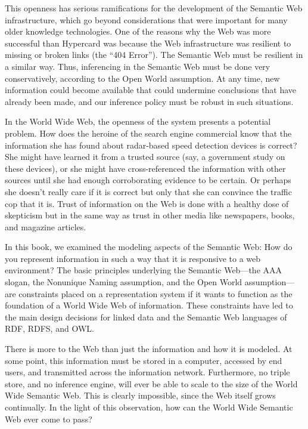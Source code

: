 This openness has serious ramifications for  the development of the Semantic Web infrastructure, which go
beyond considerations that were important for many older knowledge technologies. 
One of the reasons why the Web was more successful than
Hypercard was because the Web infrastructure was resilient to missing or
broken links (the ``404 Error''). The Semantic Web must be resilient in
a similar way. Thus, inferencing in the Semantic Web must be done very
conservatively, according to the Open World assumption. At any time, new
information could become available that could undermine conclusions that
have already been made, and our inference policy must be robust in such
situations.

In the World Wide Web, the openness of the system presents a potential
problem. How does the heroine of the search engine commercial know that
the information she has found about radar-based speed detection devices is correct? She might have learned it from a
trusted source (say, a government study on these devices), or she might
have cross-referenced the information with other sources until she had
enough corroborating evidence to be certain. Or perhaps she doesn't
really care if it is correct but only that she can convince the traffic
cop that it is. Trust of information on the Web is done with a healthy
dose of skepticism but in the same way as trust in other media like
newspapers, books, and magazine articles.

In this book, we examined the modeling aspects of the Semantic Web: How
do you represent information in such a way that it is responsive to a
web environment? The basic principles underlying the Semantic Web---the
AAA slogan, the Nonunique Naming assumption, and the Open World
assumption---are constraints placed on a representation system if it
wants to function as the foundation of a World Wide Web of information.
These constraints have led to the main design decisions for linked data and the Semantic
Web languages of RDF, RDFS, and OWL.

There is more to the Web than just the information and how it is modeled.
At some point, this information must be stored in a computer, accessed
by end users, and transmitted across the information network.
Furthermore, no triple store, and no inference engine, will ever be able
to scale to the size of the World Wide Semantic Web. This is clearly
impossible, since the Web itself grows continually. In the light of this
observation, how can the World Wide Semantic Web ever come to pass?

